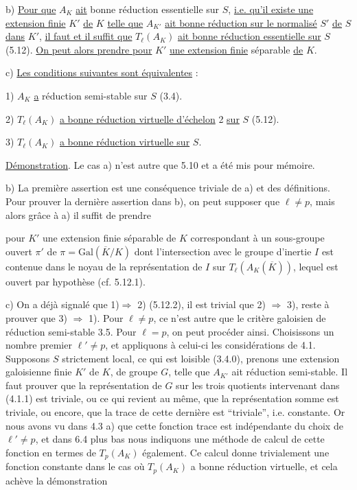 b) \underline{Pour que} $A_K$ \underline{ait} bonne réduction essentielle sur $S$, \underline{i.e. qu'il existe une extension finie} $K'$ \underline{de} $K$ \underline{telle que} $A_{K'}$ \underline{ait bonne réduction sur le normalisé} $S'$ \underline{de} $S$ \underline{dans} $K'$, \underline{il faut et il suffit que} $T_\ell(A_K)$ \underline{ait bonne réduction essentielle sur} $S$ (5.12). \underline{On peut alors prendre pour} $K'$ \underline{une extension finie} séparable \underline{de} $K$.

c) \underline{Les conditions suivantes sont équivalentes} :

1) $A_K$ \underline{a} réduction semi-stable sur $S$ (3.4).

2) $T_\ell(A_K)$ \underline{a bonne réduction virtuelle d'échelon} 2 \underline{sur} $S$ (5.12).

3) $T_\ell(A_K)$ \underline{a bonne réduction virtuelle sur} $S$.

\underline{Démonstration}. Le cas a) n'est autre que 5.10 et a été mis pour mémoire.

b) La première assertion est une conséquence triviale de a) et des définitions. Pour prouver la dernière assertion dans b), on peut supposer que $\ell \neq p$, mais alors grâce à a) il suffit de prendre



pour $K'$ une extension finie séparable de $K$ correspondant à un sous-groupe ouvert $\pi'$ de $\pi = \mathrm{Gal}(\overline{K}/K)$ dont l'intersection avec le groupe d'inertie $I$ est contenue dans le noyau de la représentation de $I$ sur $T_\ell(A_K(\overline{K}))$, lequel est ouvert par hypothèse (cf. 5.12.1).

c) On a déjà signalé que 1)$\Longrightarrow$ 2) (5.12.2), il est trivial que 2) $\Longrightarrow$ 3), reste à prouver que 3) $\Longrightarrow$ 1). Pour $\ell \neq p$, ce n'est autre que le critère galoisien de réduction semi-stable 3.5. Pour $\ell = p$, on peut procéder ainsi. Choisissons un nombre premier $\ell' \neq p$, et appliquons à celui-ci les considérations de 4.1. Supposons $S$ strictement local, ce qui est loisible (3.4.0), prenons une extension galoisienne finie $K'$ de $K$, de groupe $G$, telle que $A_{K'}$ ait réduction semi-stable. Il faut prouver que la représentation de $G$ sur les trois quotients intervenant dans (4.1.1) est triviale, ou ce qui revient au même, que la représentation somme est triviale, ou encore, que la trace de cette dernière est ``triviale'', i.e. constante. Or nous avons vu dans 4.3 a) que cette fonction trace est indépendante du choix de $\ell' \neq p$, et dans 6.4 plus bas nous indiquons une méthode de calcul de cette fonction en termes de $T_p(A_K)$ également. Ce calcul donne trivialement une fonction constante dans le cas où $T_p(A_K)$ a bonne réduction virtuelle, et cela achève la démonstration

